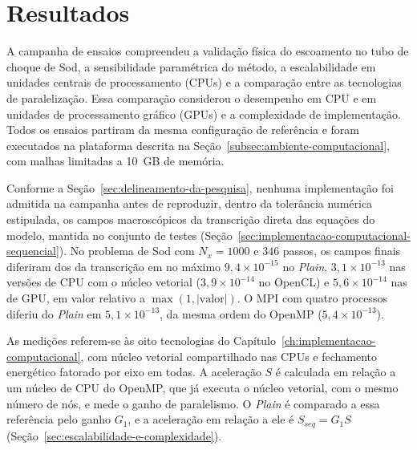 
\chapter[Resultados]{Resultados}\label{ch:resultados}






A campanha de ensaios compreendeu a validação física do escoamento no tubo de choque de Sod, a sensibilidade paramétrica do método, a escalabilidade em unidades centrais de processamento (CPUs) e a comparação entre as tecnologias de paralelização.
Essa comparação considerou o desempenho em CPU e em unidades de processamento gráfico (GPUs) e a complexidade de implementação.
Todos os ensaios partiram da mesma configuração de referência e foram executados na plataforma descrita na Seção~\ref{subsec:ambiente-computacional}, com malhas limitadas a 10~GB de memória.

Conforme a Seção~\ref{sec:delineamento-da-pesquisa}, nenhuma implementação foi admitida na campanha antes de reproduzir, dentro da tolerância numérica estipulada, os campos macroscópicos da transcrição direta das equações do modelo, mantida no conjunto de testes (Seção~\ref{sec:implementacao-computacional-sequencial}).
No problema de Sod com $N_x = 1000$ e $346$ passos, os campos finais diferiram dos da transcrição em no máximo $9{,}4 \times 10^{-15}$ no \textit{Plain}, $3{,}1 \times 10^{-13}$ nas versões de CPU com o núcleo vetorial ($3{,}9 \times 10^{-14}$ no OpenCL) e $5{,}6 \times 10^{-14}$ nas de GPU, em valor relativo a $\max(1, |\text{valor}|)$.
O MPI com quatro processos diferiu do \textit{Plain} em $5{,}1 \times 10^{-13}$, da mesma ordem do OpenMP ($5{,}4 \times 10^{-13}$).

As medições referem-se às oito tecnologias do Capítulo~\ref{ch:implementacao-computacional}, com núcleo vetorial compartilhado nas CPUs e fechamento energético fatorado por eixo em todas.
A aceleração $S$ é calculada em relação a um núcleo de CPU do OpenMP, que já executa o núcleo vetorial, com o mesmo número de nós, e mede o ganho de paralelismo.
O \textit{Plain} é comparado a essa referência pelo ganho $G_1$, e a aceleração em relação a ele é $S_{seq} = G_1 S$ (Seção~\ref{sec:escalabilidade-e-complexidade}).

